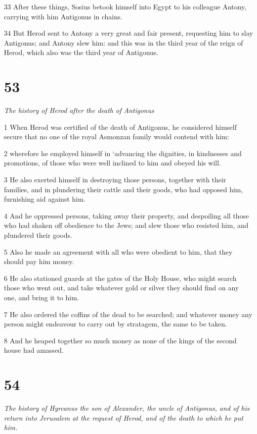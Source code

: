 33 After these things, Sosius betook himself into Egypt to his colleague Antony, carrying with him Antigonus in chains. 

34 But Herod sent to Antony a very great and fair present, requesting him to slay Antigonus; and Antony slew him: and this was in the third year of the reign of Herod, which also was the third year of Antigonus. 

\chapter{53}

\par \textit{The history of Herod after the death of Antigonus}

1 When Herod was certified of the death of Antigonus, he considered himself secure that no one of the royal Asmonzan family would contend with him: 

2 wherefore he employed himself in ‘advancing the dignities, in kindnesses and promotions, of those who were well inclined to him and obeyed his will. 

3 He also exerted himself in destroying those persons, together with their families, and in plundering their cattle and their goods, who had opposed him, furnishing aid against him. 

4 And he oppressed persons, taking away their property, and despoiling all those who had shaken off obedience to the Jews; and slew those who resisted him, and plundered their goods. 

5 Also he made an agreement with all who were obedient to him, that they should pay him money. 

6 He also stationed guards at the gates of the Holy House, who might search those who went out, and take whatever gold or silver they should find on any one, and bring it to him. 

7 He also ordered the coffins of the dead to be searched; and whatever money any person might endeavour to carry out by stratagem, the same to be taken. 

8 And he heaped together so much money as none of the kings of the second house had amassed. 

\chapter{54}

\par \textit{The history of Hyrcanus the son of Alexander, the uncle of Antigonus, and of his return into Jerusalem at the request of Herod, and of the death to which he put him.}

